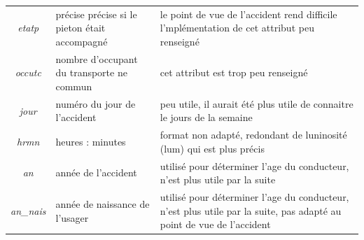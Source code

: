 \documentclass{article}
\begin{document}
\begin{center}
\begin{tabular}{ |c|p{4.5cm}|p{4.5cm} }
            \textit{etatp} & précise précise si le pieton était accompagné & le point de vue de l'accident rend difficile l'mplémentation de cet attribut peu renseigné\\
            \textit{occutc} & nombre d'occupant du transporte ne commun & cet attribut est trop peu renseigné\\
            \textit{jour} & numéro du jour de l'accident & peu utile, il aurait été plus utile de connaitre le jours de la semaine\\
            \textit{hrmn} & heures : minutes & format non adapté, redondant de luninosité (lum) qui est plus précis\\
            \textit{an} & année de l'accident & utilisé pour déterminer l'age du conducteur, n'est plus utile par la suite \\
            \textit{an\_nais} & année de naissance de l'usager & utilisé pour déterminer l'age du conducteur, n'est plus utile par la suite, pas adapté au point de vue de l'accident \\
            \hline
        \end{tabular}
    \end{center}
    \newpage
\end{document}

